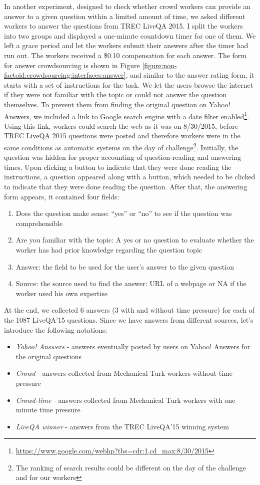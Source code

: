 In another experiment, designed to check whether crowd workers can provide an answer to a given question within a limited amount of time, we asked different workers to answer the questions from TREC LiveQA 2015.
I split the workers into two groups and displayed a one-minute countdown timer for one of them.
We left a grace period and let the workers submit their answers after the timer had run out.
The workers received a \$0.10 compensation for each answer.
The form for answer crowdsourcing is shown in Figure \ref{figure:non-factoid:crowdsourcing:interfaces:answer}, and similar to the answer rating form, it starts with a set of instructions for the task.
We let the users browse the internet if they were not familiar with the topic or could not answer the question themselves.
To prevent them from finding the original question on Yahoo! Answers, we included a link to Google search engine with a date filter enabled\footnote{\href{url}{https://www.google.com/webhp?tbs=cdr:1,cd\_max:8/30/2015}}.
Using this link, workers could search the web as it was on 8/30/2015, before TREC LiveQA 2015 questions were posted and therefore workers were in the same conditions as automatic systems on the day of challenge\footnote{The ranking of search results could be different on the day of the challenge and for our workers}.
Initially, the question was hidden for proper accounting of question-reading and answering times.
Upon clicking a button to indicate that they were done reading the instructions, a question appeared along with a button, which needed to be clicked to indicate that they were done reading the question.
After that, the answering form appears, it contained four fields:
\begin{enumerate}[noitemsep]
\item Does the question make sense: ``yes'' or ``no'' to see if the question was comprehensible
\item Are you familiar with the topic: A yes or no question to evaluate whether the worker has had prior knowledge regarding the question topic
\item Answer: the field to be used for the user's answer to the given question
\item Source: the source used to find the answer: URL of a webpage or NA if the worker used his own expertise
\end{enumerate}

At the end, we collected 6 answers (3 with and without time pressure) for each of the 1087 LiveQA'15 questions.
Since we have answers from different sources, let's introduce the following notations:
\begin{itemize}[noitemsep]
    \item \textit{Yahoo! Answers} - answers eventually posted by users on Yahoo! Answers for the original questions
    \item \textit{Crowd} - answers collected from Mechanical Turk workers without time pressure
    \item \textit{Crowd-time} - answers collected from Mechanical Turk workers with one minute time pressure
    \item \textit{LiveQA winner} - answers from the TREC LiveQA'15 winning system
\end{itemize}

